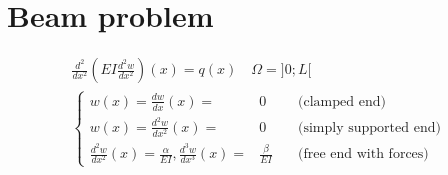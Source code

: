 %
\section{Beam problem}\label{sec:}
%
\newcommand{\primitive}[3]{\left[{#1}\right]_{#2}^{#3}}
%
\begin{equation}\label{eq:beam_strong}
\begin{aligned}
\frac{d^2}{dx^2} (EI \frac{d^2 w}{dx^2})(x) = q(x)\quad \Omega=]0;L[\\
%
\left\{
\begin{aligned}
w(x) = \frac{d w}{dx}(x) =& 0 &\quad\mbox{(clamped end)}\\
w(x) = \frac{d^2 w}{dx^2}(x) =& 0 &\quad\mbox{(simply supported end)}\\
\frac{d^2 w}{dx^2}(x) = \frac{\alpha}{EI}, \frac{d^3 w}{dx^3}(x) =& \frac{\beta}{EI}&\quad\mbox{(free end with forces)}
\end{aligned}
\right.
%
\end{aligned}
\end{equation}
%
%
%
